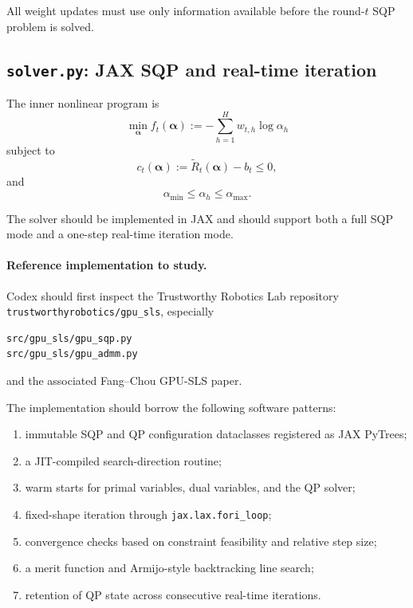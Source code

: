 \documentclass[11pt]{article}
\begin{document}
All weight updates must use only information available before the
round-$t$ SQP problem is solved.

\subsection{\texttt{solver.py}: JAX SQP and real-time iteration}
\label{app:sqp-implementation}

The inner nonlinear program is
\[
    \min_{\bm\alpha}
    f_t(\bm\alpha)
    :=
    -
    \sum_{h=1}^{H}
    w_{t,h}\log\alpha_h
\]
subject to
\[
    c_t(\bm\alpha)
    :=
    \widetilde R_t(\bm\alpha)-b_t
    \le0,
\]
and
\[
    \alpha_{\min}
    \le
    \alpha_h
    \le
    \alpha_{\max}.
\]

The solver should be implemented in JAX and should support both a full SQP
mode and a one-step real-time iteration mode.

\paragraph{Reference implementation to study.}

Codex should first inspect the Trustworthy Robotics Lab repository
\texttt{trustworthyrobotics/gpu\_sls}, especially

\begin{verbatim}
src/gpu_sls/gpu_sqp.py
src/gpu_sls/gpu_admm.py
\end{verbatim}

and the associated Fang--Chou GPU-SLS paper.

The implementation should borrow the following software patterns:

\begin{enumerate}[leftmargin=*]
    \item immutable SQP and QP configuration dataclasses registered as JAX
    PyTrees;

    \item a JIT-compiled search-direction routine;

    \item warm starts for primal variables, dual variables, and the QP
    solver;

    \item fixed-shape iteration through \texttt{jax.lax.fori\_loop};

    \item convergence checks based on constraint feasibility and relative
    step size;

    \item a merit function and Armijo-style backtracking line search;

    \item retention of QP state across consecutive real-time iterations.
\end{enumerate}
\end{document}
